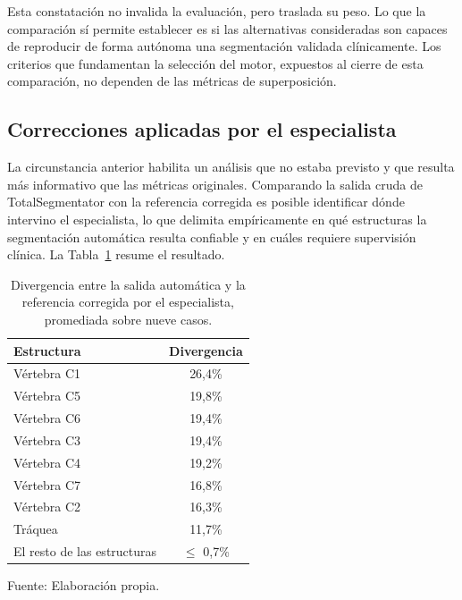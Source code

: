 Esta constatación no invalida la evaluación, pero traslada su peso. Lo que la comparación sí permite establecer es si las alternativas consideradas son capaces de reproducir de forma autónoma una segmentación validada clínicamente. Los criterios que fundamentan la selección del motor, expuestos al cierre de esta comparación, no dependen de las métricas de superposición.\\

\subsection{Correcciones aplicadas por el especialista}

La circunstancia anterior habilita un análisis que no estaba previsto y que resulta más informativo que las métricas originales. Comparando la salida cruda de TotalSegmentator con la referencia corregida es posible identificar dónde intervino el especialista, lo que delimita empíricamente en qué estructuras la segmentación automática resulta confiable y en cuáles requiere supervisión clínica. La Tabla~\ref{tab:correcciones} resume el resultado.\\

\begin{table}[H]
  \centering
  \caption{Divergencia entre la salida automática y la referencia corregida por el especialista, promediada sobre nueve casos.}
  \vspace{5pt}
  \label{tab:correcciones}
  \begin{tabular}{lc}
    \hline
    \textbf{Estructura} & \textbf{Divergencia} \\
    \hline
    Vértebra C1 & 26,4\% \\
    Vértebra C5 & 19,8\% \\
    Vértebra C6 & 19,4\% \\
    Vértebra C3 & 19,4\% \\
    Vértebra C4 & 19,2\% \\
    Vértebra C7 & 16,8\% \\
    Vértebra C2 & 16,3\% \\
    Tráquea     & 11,7\% \\
    \hline
    El resto de las estructuras & $\leq$ 0,7\% \\
    \hline
  \end{tabular}
  \begin{minipage}{\textwidth}
    \centering
    \vspace{5pt}
    \normalsize Fuente: Elaboración propia.\\
  \end{minipage}
\end{table}

